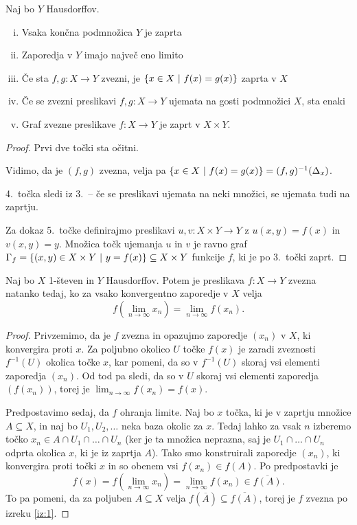 \begin{izrek}
Naj bo $Y$ Hausdorffov.

\begin{enumerate}[i)]
\item Vsaka končna podmnožica $Y$ je zaprta
\item Zaporedja v $Y$ imajo največ eno limito
\item Če sta $f, g \colon X \to Y$ zvezni, je
$\left\{x \in X~\middle\vert~f(x) = g(x)\right\}$ zaprta v $X$
\item Če se zvezni preslikavi $f, g \colon X \to Y$ ujemata na
gosti podmnožici $X$, sta enaki
\item Graf zvezne preslikave $f \colon X \to Y$ je zaprt v
$X \times Y$.
\end{enumerate}
\end{izrek}

\begin{proof}
Prvi dve točki sta očitni.

Vidimo, da je $(f,g)$ zvezna, velja pa
$\left\{x \in X~\middle\vert~f(x) = g(x)\right\} = (f, g)^{-1}(\Delta_x)$.

4.\ točka sledi iz 3.\ -- če se preslikavi ujemata na neki množici,
se ujemata tudi na zaprtju.

Za dokaz 5.\ točke definirajmo preslikavi
$u, v \colon X \times Y \to Y$ z $u(x,y) = f(x)$ in $v(x,y) = y$.
Množica točk ujemanja $u$ in $v$ je ravno graf
$\Gamma_f =
\left\{(x,y) \in X \times Y~\middle\vert~y = f(x)\right\} \subseteq X \times Y$
 funkcije $f$, ki je po 3.\ točki zaprt.
\end{proof}

\begin{izrek}
Naj bo $X$ 1-števen in $Y$ Hausdorffov. Potem je preslikava
$f \colon X \to Y$ zvezna natanko tedaj, ko za vsako konvergentno
zaporedje v $X$ velja
\[
f\left(\lim_{n\to\infty} x_n\right) = \lim_{n\to\infty} f(x_n).
\]
\end{izrek}

\begin{proof}
Privzemimo, da je $f$ zvezna in opazujmo zaporedje $(x_n)$ v $X$,
ki konvergira proti $x$. Za poljubno okolico $U$ točke $f(x)$ je
zaradi zveznosti $f^{-1}(U)$ okolica točke $x$, kar pomeni, da so v
$f^{-1}(U)$ skoraj vsi elementi zaporedja $(x_n)$. Od tod pa sledi,
da so v $U$ skoraj vsi elementi zaporedja $(f(x_n))$, torej je
$\lim_{n \to \infty} f(x_n) = f(x)$.

Predpostavimo sedaj, da $f$ ohranja limite. Naj bo $x$ točka, ki je
v zaprtju množice $A \subseteq X$, in naj bo $U_1, U_2, \dots$ neka
baza okolic za $x$. Tedaj lahko za vsak $n$ izberemo točko
$x_n \in A \cap U_1 \cap \dots \cap U_n$ (ker je ta množica
neprazna, saj je $U_1 \cap \dots \cap U_n$ odprta okolica $x$, ki
je iz zaprtja $A$). Tako smo konstruirali zaporedje $(x_n)$, ki
konvergira proti točki $x$ in so obenem vsi $f(x_n) \in f(A)$. Po
predpostavki je
\[
f(x) =
f\left(\lim_{n \to \infty} x_n\right) =
\lim_{n \to \infty} f(x_n)
\in \overline{f(A)}.
\]
To pa pomeni, da za poljuben $A \subseteq X$ velja
$f(\overline{A}) \subseteq \overline{f(A)}$, torej je $f$ zvezna po
izreku \ref{iz:1}.
\end{proof}

